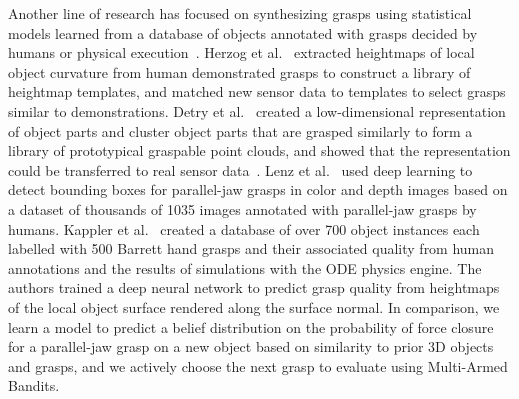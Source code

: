 Another line of research has focused on synthesizing grasps using statistical models learned from a database of objects annotated with grasps decided by humans or physical execution~\cite{bohg2014data}.
Herzog et al.~\cite{herzog2012template, herzog2014learning} extracted heightmaps of local object curvature from human demonstrated grasps to construct a library of heightmap templates, and matched new sensor data to templates to select grasps similar to demonstrations.
Detry et al.~\cite{detry2012generalizing} created a low-dimensional representation of object parts and cluster object parts that are grasped similarly to form a library of prototypical graspable point clouds, and showed that the representation could be transferred to real sensor data~\cite{detry2013learning}.
Lenz et al.~\cite{lenz2015deep} used deep learning to detect bounding boxes for parallel-jaw grasps in color and depth images based on a dataset of thousands of 1035 images annotated with parallel-jaw grasps by humans.
Kappler et al.~\cite{kappler2015leveraging} created a database of over 700 object instances each labelled with 500 Barrett hand grasps and their associated quality from human annotations and the results of simulations with the ODE physics engine.
The authors trained a deep neural network to predict grasp quality from heightmaps of the local object surface rendered along the surface normal.
In comparison, we learn a model to predict a belief distribution on the probability of force closure for a parallel-jaw grasp on a new object based on similarity to prior 3D objects and grasps, and we actively choose the next grasp to evaluate using Multi-Armed Bandits.

